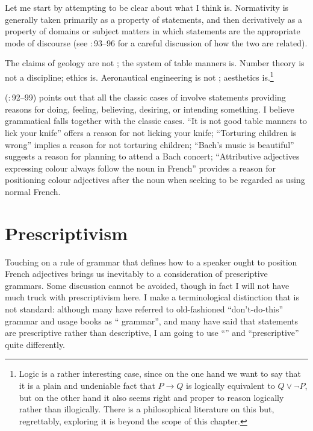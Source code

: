 \documentclass[output=paper]{langscibook}
\begin{document}
Let me start by attempting to be clear about what I think  is. Normativity is generally taken primarily as a property of statements, and then derivatively as a property of domains or subject matters in which  statements are the appropriate mode of discourse (see \citealt{Millar04}:\,93--96 for a careful discussion of how the two are related).

The claims of geology are not ; the system of table manners is. Number theory is not a  discipline; ethics is. Aeronautical engineering is not ; aesthetics is.\footnote{Logic is a rather interesting case, since on the one hand we want to say that it is a plain and undeniable fact that $P \rightarrow Q$ is logically equivalent to $Q \vee \neg P$, but on the other hand it also seems right and proper to reason logically rather than illogically. There is a philosophical literature on this but, regrettably, exploring it is  beyond the scope of this chapter.}

{\Millar} (\citeyear{Millar04}:\,92--99) points out that all the classic cases of  involve  statements providing reasons for doing, feeling, believing, desiring, or intending something. I believe grammatical  falls together with the classic cases. ``It is not good table manners to lick your knife'' offers a reason for not licking your knife; ``Torturing children is wrong'' implies a reason for not torturing children; ``Bach's music is beautiful'' suggests a reason for planning to attend a Bach concert; ``Attributive adjectives expressing colour always follow the noun in French'' provides a reason for positioning colour adjectives after the noun when seeking to be regarded as using normal French.

\section{Prescriptivism}
\label{sec:pullum:prescriptivism}

Touching on a rule of grammar that defines how to a speaker ought to position French adjectives brings us inevitably to a consideration of prescriptive grammars. Some discussion cannot be avoided, though in fact I will not have much truck with prescriptivism here. I make a terminological distinction that is not standard: although many have referred to old-fashioned ``don't-do-this'' grammar and usage books as `` grammar'', and many have said that  statements are prescriptive rather than descriptive, I am going to use ``'' and ``prescriptive'' quite differently.
\end{document}
